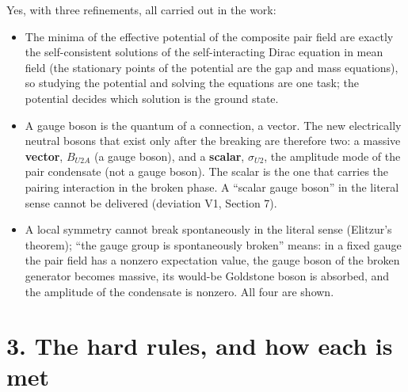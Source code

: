 \documentclass[
  10pt,
]{article}
\providecommand{\tightlist}{%
  \setlength{\itemsep}{0pt}\setlength{\parskip}{0pt}}
\begin{document}
Yes, with three refinements, all carried out in the work:

\begin{itemize}
\tightlist
\item
  The minima of the effective potential of the composite pair field are
  exactly the self-consistent solutions of the self-interacting Dirac
  equation in mean field (the stationary points of the potential are the
  gap and mass equations), so studying the potential and solving the
  equations are one task; the potential decides which solution is the
  ground state.
\item
  A gauge boson is the quantum of a connection, a vector. The new
  electrically neutral bosons that exist only after the breaking are
  therefore two: a massive \textbf{vector}, \(B_{U2A}\) (a gauge boson),
  and a \textbf{scalar}, \(\sigma_{U2}\), the amplitude mode of the pair
  condensate (not a gauge boson). The scalar is the one that carries the
  pairing interaction in the broken phase. A ``scalar gauge boson'' in
  the literal sense cannot be delivered (deviation V1, Section 7).
\item
  A local symmetry cannot break spontaneously in the literal sense
  (Elitzur's theorem); ``the gauge group is spontaneously broken''
  means: in a fixed gauge the pair field has a nonzero expectation
  value, the gauge boson of the broken generator becomes massive, its
  would-be Goldstone boson is absorbed, and the amplitude of the
  condensate is nonzero. All four are shown.
\end{itemize}

\hypertarget{the-hard-rules-and-how-each-is-met}{%
\section{3. The hard rules, and how each is
met}\label{the-hard-rules-and-how-each-is-met}}
\end{document}
